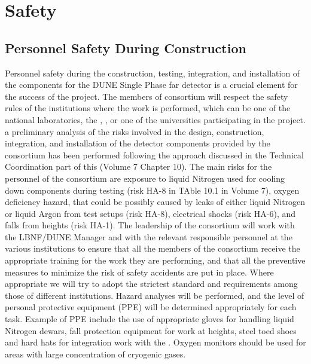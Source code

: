 \section{Safety}
\label{sec:fdsp-tpcelec-safety}

\subsection{Personnel Safety During Construction}
\label{sec:fdsp-tpcelec-safety-personnel}

Personnel safety during the construction, testing, integration,
and installation of the  components for the DUNE
Single Phase far detector is a crucial element for the success
of the project. The members of  consortium will
respect the safety rules of the institutions where the work is
performed, which can be one of the national laboratories, the , \surf,
or one of the universities participating in the project. a
preliminary analysis of the risks involved in the design,
construction, integration, and installation of the detector
components provided by the  consortium has been
performed following the approach discussed in the Technical
Coordination part of this  (Volume 7 Chapter 10). %
The main risks for the personnel of the consortium are exposure to
liquid Nitrogen used for cooling down components during testing (risk HA-8
in TAble 10.1 in Volume 7),
oxygen deficiency hazard, that could be possibly caused by leaks
of either liquid Nitrogen or liquid Argon from test setups (risk HA-8),
electrical shocks (risk HA-6), and falls from heights (risk HA-1). The leadership of the
 consortium will work with the LBNF/DUNE
 Manager and with the relevant responsible personnel at the
various institutions to ensure that all the members of the
consortium receive the appropriate training for the work they
are performing, and that all the preventive measures to minimize
the risk of safety accidents are put in place. Where appropriate
we will try to adopt the strictest standard and requirements among
those of different institutions. Hazard analyses will be performed,
and the level of personal protective equipment (PPE) will be determined
appropriately for each task. Example of PPE include the use of
appropriate gloves for handling liquid Nitrogen dewars, fall
protection equipment for work at heights, steel toed shoes and
hard hats for integration work with the . Oxygen
monitors should be used for areas with large concentration of
cryogenic gases.

